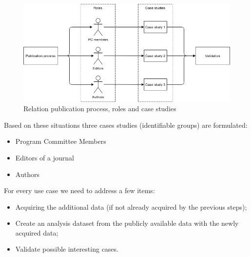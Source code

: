 \documentclass{ou-report}
\newcommand{\todo}[1]{{\color{red} TODO: #1}}
\begin{document}
\begin{figure}[H]
\centering
\includegraphics[width=13cm]{images/research_method/research_method.png}
\caption{Relation publication process, roles and case studies}
\label{fig:research_method}
\end{figure}
Based on these situations three cases studies (identifiable groups) are formulated:
\begin{itemize}
    \item Program Committee Members
    \item Editors of a journal
    \item Authors %
\end{itemize}

For every use case we need to address a few items:
\begin{itemize}
    \item Acquiring the additional data (if not already acquired by the previous steps);
    \item Create an analysis dataset from the publicly available data with the 
    newly acquired data;
    \item Validate possible interesting cases.
\end{itemize}


\end{document}
